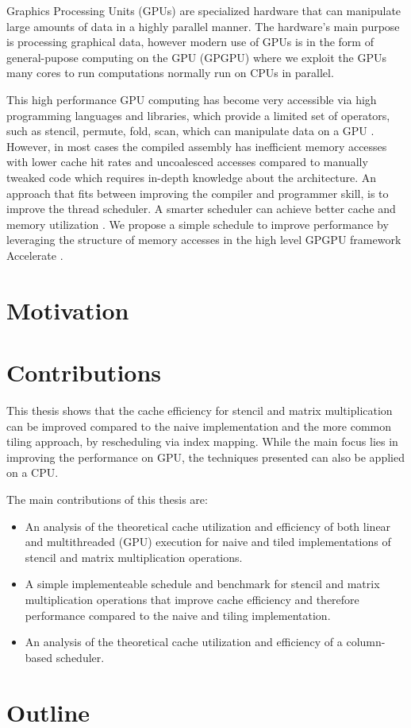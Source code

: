 Graphics Processing Units (GPUs) are specialized hardware that can manipulate large amounts of data in a highly parallel manner.
The hardware's main purpose is processing graphical data, however modern use of GPUs is in the form of general-pupose computing on the GPU (GPGPU) where we exploit the GPUs many cores to run computations normally run on CPUs in parallel.

This high performance GPU computing has become very accessible via high programming languages and libraries, which provide a limited set of operators, such as stencil, permute, fold, scan, which can manipulate data on a GPU \cite{chakravarty2011accelerating}.
However, in most cases the compiled assembly has inefficient memory accesses with lower cache hit rates and uncoalesced accesses compared to manually tweaked code which requires in-depth knowledge about the architecture.
An approach that fits between improving the compiler and programmer skill, is to improve the thread scheduler.
A smarter scheduler can achieve better cache and memory utilization \cite{nugteren2014study}.
We propose a simple schedule to improve performance by leveraging the structure of memory accesses in the high level GPGPU framework Accelerate \cite{chakravarty2011accelerating}.

\section{Motivation}

\section{Contributions}
This thesis shows that the cache efficiency for stencil and matrix multiplication can be improved compared to the naive implementation and the more common tiling approach, by rescheduling via index mapping.
While the main focus lies in improving the performance on GPU, the techniques presented can also be applied on a CPU.

\vspace{1em}
The main contributions of this thesis are:
\begin{itemize}
    \item An analysis of the theoretical cache utilization and efficiency of both linear and multithreaded (GPU) execution for naive and tiled implementations of stencil and matrix multiplication operations.
    \item A simple implementeable schedule and benchmark for stencil and matrix multiplication operations that improve cache efficiency and therefore performance compared to the naive and tiling implementation.
    \item An analysis of the theoretical cache utilization and efficiency of a column-based scheduler.
\end{itemize}

\section{Outline}
